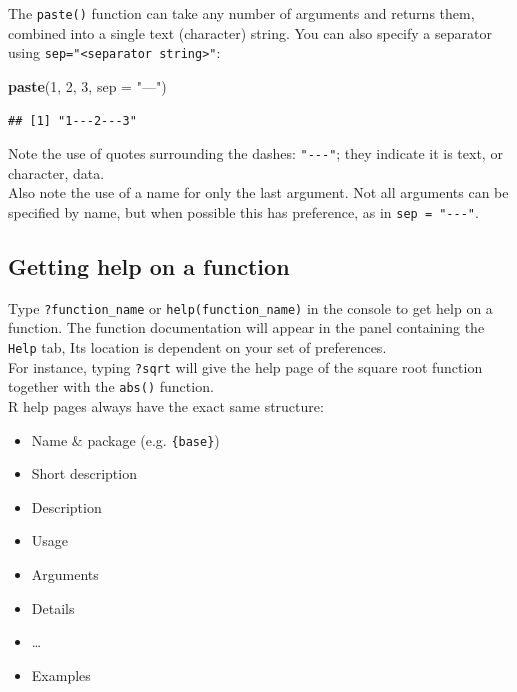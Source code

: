 \documentclass[]{book}
\newenvironment{Shaded}{\begin{snugshade}}{\end{snugshade}}
\newcommand{\DataTypeTok}[1]{\textcolor[rgb]{0.13,0.29,0.53}{#1}}
\newcommand{\DecValTok}[1]{\textcolor[rgb]{0.00,0.00,0.81}{#1}}
\newcommand{\KeywordTok}[1]{\textcolor[rgb]{0.13,0.29,0.53}{\textbf{#1}}}
\newcommand{\NormalTok}[1]{#1}
\newcommand{\StringTok}[1]{\textcolor[rgb]{0.31,0.60,0.02}{#1}}
\providecommand{\tightlist}{%
  \setlength{\itemsep}{0pt}\setlength{\parskip}{0pt}}
\begin{document}
The \texttt{paste()} function can take any number of arguments and returns them, combined into a single text (character) string. You can also specify a separator using \texttt{sep="\textless{}separator\ string\textgreater{}"}:

\begin{Shaded}
\begin{Highlighting}[]
\KeywordTok{paste}\NormalTok{(}\DecValTok{1}\NormalTok{, }\DecValTok{2}\NormalTok{, }\DecValTok{3}\NormalTok{, }\DataTypeTok{sep =} \StringTok{"---"}\NormalTok{)}
\end{Highlighting}
\end{Shaded}

\begin{verbatim}
## [1] "1---2---3"
\end{verbatim}

Note the use of quotes surrounding the dashes: \texttt{"-\/-\/-"}; they indicate it is text, or character, data.\\
Also note the use of a name for only the last argument. Not all arguments can be specified by name, but when possible this has preference, as in \texttt{sep\ =\ "-\/-\/-"}.

\hypertarget{getting-help-on-a-function}{%
\subsection{Getting help on a function}\label{getting-help-on-a-function}}

Type \texttt{?function\_name} or \texttt{help(function\_name)} in the console to get help on a function. The function documentation will appear in the panel containing the \texttt{Help} tab, Its location is dependent on your set of preferences.\\
For instance, typing \texttt{?sqrt} will give the help page of the square root function together with the \texttt{abs()} function.\\
R help pages always have the exact same structure:

\begin{itemize}
\tightlist
\item
  Name \& package (e.g. \texttt{\{base\}})
\item
  Short description
\item
  Description
\item
  Usage
\item
  Arguments
\item
  Details
\item
  \ldots{}
\item
  Examples
\end{itemize}
\end{document}
